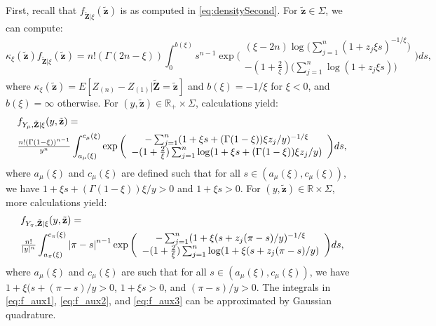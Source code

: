 First, recall that $f_{\mathbf{\tilde{Z}}|\xi }(\mathbf{\tilde{z}})$ is as computed in \eqref{eq:densitySecond}. 
For $\mathbf{\tilde{z}} \in \Sigma$, we can compute:
\begin{equation}
    \kappa _{\xi }(\tilde{\mathbf{z}})f_{\tilde{\mathbf{Z}}|\xi }(\tilde{\mathbf{
z}})=n!(\Gamma (2n-\xi ))\int_{0}^{b(\xi )}s^{n-1}\exp \bigg(
\begin{array}{c}
(\xi -2n)\log \big(\sum_{j=1}^{n}(1+z_{j}\xi s)^{-1/\xi }\big)\\ -(1+\tfrac{2}{ \xi })\big(\sum_{j=1}^{n}\log (1+z_{j}\xi s)\big)
\end{array}
\bigg)ds,
\label{eq:f_aux1}
\end{equation}
where $\kappa _{\xi }(\mathbf{\tilde{z}})=E[Z_{(n)}-Z_{(1)}|\mathbf{\tilde{Z}}=\mathbf{\tilde{z}}]$ and $b(\xi )=-1/\xi $ for $\xi <0$, and $b(\xi )=\infty $ otherwise. For $(y,\mathbf{\tilde{z}}) \in \mathbb{R}_{+} \times \Sigma$, calculations yield:
\begin{align}
     &f_{Y_{\mu },\tilde{\mathbf{Z}}|\xi }(y,\tilde{\mathbf{z}})=\notag\\
     &\tfrac{n!(\Gamma (1-\xi))^{n-1}}{y^{n}}\int_{a_{\mu }(\xi )}^{c_{\mu }(\xi )}\exp \bigg(
\begin{array}{c}
-\sum_{j=1}^{n}(1+\xi s+(\Gamma (1-\xi ))\xi {z_{j}}/{y})^{-1/\xi } \\ -(1+\tfrac{2}{\xi })\sum_{j=1}^{n}\log (1+\xi s+(\Gamma (1-\xi ))\xi z_{j}/{y} )
\end{array}
\bigg)ds,
\label{eq:f_aux2}   
\end{align}
where 
$a_{\mu }(\xi )$ and $c_{\mu }(\xi )$ are defined such that for all $s\in (a_{\mu }(\xi ),c_{\mu }(\xi ))$, we have $1+\xi s+(\Gamma (1-\xi ))\xi/y>0$ and $1+\xi s>0$. For $(y,\mathbf{\tilde{z}}) \in \mathbb{R} \times \Sigma$, more calculations yield:
\begin{align}
    &f_{Y_{\pi },\tilde{\mathbf{Z}}|\xi }(y,\tilde{\mathbf{z}})=\notag\\
    &\tfrac{n!}{|y|^{n}}\int_{a_{\pi }(\xi )}^{c_{\pi }(\xi )}{|\pi-s|}^{n-1}\exp \bigg(
\begin{array}{c}
-\sum_{j=1}^{n}(1+\xi (s+{z_{j}}(\pi -s)/y)^{-1/\xi } \\ 
-(1+\tfrac{2}{\xi })\sum_{j=1}^{n}\log (1+\xi (s+z_{j}(\pi -s)/y)
\end{array}
\bigg)ds,
\label{eq:f_aux3}
\end{align}
where 
$a_{\mu }(\xi )$ and $c_{\mu }(\xi )$ are such that for all $s\in
(a_{\mu }(\xi ),c_{\mu }(\xi ))$, we have $1+\xi (s+(\pi -s)/y>0$, $1+\xi s>0
$, and $(\pi -s)/y>0$. The integrals in \eqref{eq:f_aux1}, \eqref{eq:f_aux2}, and \eqref{eq:f_aux3} can be approximated by Gaussian quadrature.

